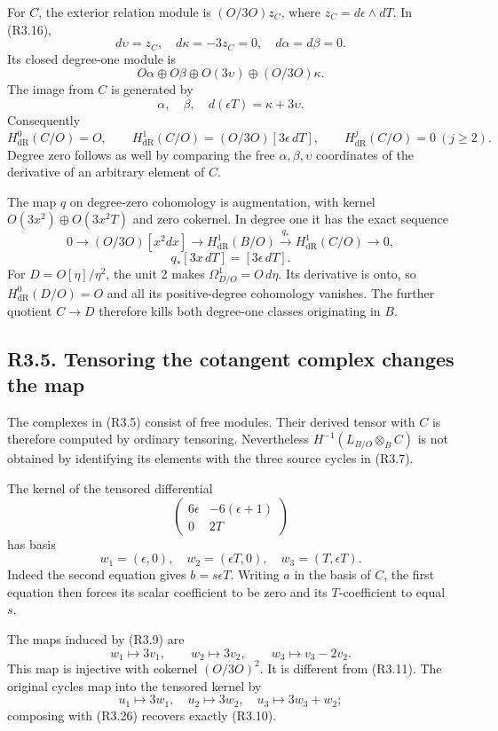 \documentclass[
]{article}
\begin{document}
For \(C\), the exterior relation module is \((O/3O)z_C\), where
\(z_C=d\epsilon\wedge dT\). In (R3.16), \[
d\upsilon=z_C,\quad d\kappa=-3z_C=0,\quad
d\alpha=d\beta=0.
\] Its closed degree-one module is \[
O\alpha\oplus O\beta\oplus O(3\upsilon)\oplus(O/3O)\kappa.
\] The image from \(C\) is generated by \[
\alpha,\quad\beta,\quad d(\epsilon T)=\kappa+3\upsilon.
\] Consequently \[
H^0_{\mathrm{dR}}(C/O)=O,\qquad
H^1_{\mathrm{dR}}(C/O)=(O/3O)[3\epsilon\,dT],\qquad
H^j_{\mathrm{dR}}(C/O)=0\ (j\ge2).
\tag{R3.23}
\] Degree zero follows as well by comparing the free
\(\alpha,\beta,\upsilon\) coordinates of the derivative of an arbitrary
element of \(C\).

The map \(q\) on degree-zero cohomology is augmentation, with kernel
\(O(3x^2)\oplus O(3x^2T)\) and zero cokernel. In degree one it has the
exact sequence \[
0\longrightarrow(O/3O)[x^2dx]\longrightarrow
H^1_{\mathrm{dR}}(B/O)\xrightarrow{q_*}
H^1_{\mathrm{dR}}(C/O)\longrightarrow0,
\] \[
q_*[3x\,dT]=[3\epsilon\,dT].
\tag{R3.24}
\] For \(D=O[\eta]/\eta^2\), the unit 2 makes
\(\Omega^1_{D/O}=O\,d\eta\). Its derivative is onto, so
\(H^0_{\mathrm{dR}}(D/O)=O\) and all its positive-degree cohomology
vanishes. The further quotient \(C\to D\) therefore kills both
degree-one classes originating in \(B\).

\subsection{R3.5. Tensoring the cotangent complex changes the
map}\label{r3.5.-tensoring-the-cotangent-complex-changes-the-map}

The complexes in (R3.5) consist of free modules. Their derived tensor
with \(C\) is therefore computed by ordinary tensoring. Nevertheless
\(H^{-1}(L_{B/O}\otimes_B C)\) is not obtained by identifying its
elements with the three source cycles in (R3.7).

The kernel of the tensored differential \[
\begin{pmatrix}6\epsilon&-6(\epsilon+1)\\0&2T\end{pmatrix}
\] has basis \[
w_1=(\epsilon,0),\quad w_2=(\epsilon T,0),\quad
w_3=(T,\epsilon T).
\tag{R3.25}
\] Indeed the second equation gives \(b=s\epsilon T\). Writing \(a\) in
the basis of \(C\), the first equation then forces its scalar
coefficient to be zero and its \(T\)-coefficient to equal \(s\).

The maps induced by (R3.9) are \[
w_1\longmapsto3v_1,\qquad
w_2\longmapsto3v_2,\qquad
w_3\longmapsto v_3-2v_2.
\tag{R3.26}
\] This map is injective with cokernel \((O/3O)^2\). It is different
from (R3.11). The original cycles map into the tensored kernel by \[
u_1\longmapsto3w_1,\quad
u_2\longmapsto3w_2,\quad
u_3\longmapsto3w_3+w_2;
\] composing with (R3.26) recovers exactly (R3.10).
\end{document}
